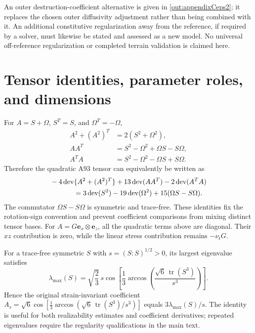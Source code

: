 \documentclass[11pt,a4paper]{article}
\numberwithin{equation}{section}
\DeclareMathOperator{\dev}{dev}
\DeclareMathOperator{\tr}{tr}
\begin{document}
An outer destruction-coefficient alternative is given in
\cref{out:appendixCeps2}; it replaces the chosen outer
diffusivity adjustment rather than being combined with it.
An additional constitutive regularization away from the reference,
if required by a solver, must likewise be stated and assessed as a
new model. No universal off-reference regularization or completed
terrain validation is claimed here.


\clearpage
\appendix

\section{Tensor identities, parameter roles, and dimensions}
\label{app:tensor}

For $A=S+\Omega$, $S^T=S$, and $\Omega^T=-\Omega$,
\begin{align}
 A^2+(A^2)^T&=2(S^2+\Omega^2),\\
 AA^T&=S^2-\Omega^2+\Omega S-S\Omega,\\
 A^TA&=S^2-\Omega^2-\Omega S+S\Omega .
\end{align}
Therefore the quadratic A93 tensor can equivalently be written as
\begin{align}
 &-4\dev\{A^2+(A^2)^T\}
       +13\dev(AA^T)-2\dev(A^TA)\nonumber\\
 &\hspace{12mm}=3\dev(S^2)-19\dev(\Omega^2)
                         +15(\Omega S-S\Omega).
\end{align}
The commutator $\Omega S-S\Omega$ is symmetric and trace-free.
These identities fix the rotation-sign convention and prevent
coefficient comparisons from mixing distinct tensor bases.
For $A=G\boldsymbol e_x\otimes\boldsymbol e_z$, all the quadratic
terms above are diagonal. Their $xz$ contribution is zero, while
the linear stress contribution remains $-\nu_tG$.

For a trace-free symmetric $S$ with $s=(S:S)^{1/2}>0$, its largest
eigenvalue satisfies
\begin{equation}
 \lambda_{\max}(S)
 =\sqrt{\frac23}\,s
 \cos\left[\frac13\arccos
 \left(\frac{\sqrt6\,\tr(S^3)}{s^3}\right)\right].
\end{equation}
Hence the original strain-invariant coefficient
$A_s=\sqrt6\cos[\frac13\arccos(\sqrt6\,\tr(S^3)/s^3)]$
equals $3\lambda_{\max}(S)/s$.
The identity is useful for both realizability estimates and
coefficient derivatives; repeated eigenvalues require the regularity
qualifications in the main text.
\end{document}
